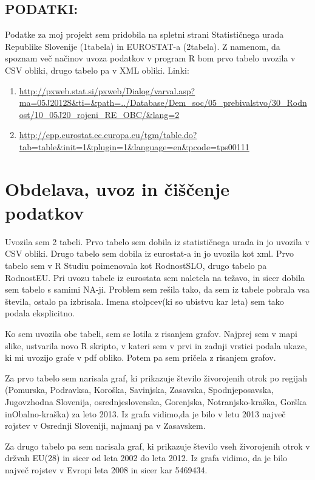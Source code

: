 \documentclass[11pt,a4paper]{article}
\begin{document}
 

\subsection{PODATKI:}
Podatke za moj projekt sem pridobila na spletni strani Statističnega urada Republike Slovenije (1tabela) in EUROSTAT-a (2tabela). Z namenom, da spoznam več načinov uvoza podatkov v program R bom prvo tabelo uvozila v CSV obliki, drugo tabelo pa v XML obliki.
Linki:
\begin{enumerate}
\item{\url{http://pxweb.stat.si/pxweb/Dialog/varval.asp?ma=05J2012S&ti=&path=../Database/Dem_soc/05_prebivalstvo/30_Rodnost/10_05J20_rojeni_RE_OBC/&lang=2}}
\item{\url{http://epp.eurostat.ec.europa.eu/tgm/table.do?tab=table&init=1&plugin=1&language=en&pcode=tps00111}}
\end{enumerate}


 
\newpage
\section{Obdelava, uvoz in čiščenje podatkov}

Uvozila sem 2 tabeli. Prvo tabelo sem dobila iz statističnega urada in jo uvozila v CSV obliki. Drugo tabelo sem dobila iz eurostat-a in jo uvozila kot xml. Prvo tabelo sem v R Studiu poimenovala kot RodnostSLO, drugo tabelo pa RodnostEU.
Pri uvozu tabele iz eurostata sem naletela na težavo, in sicer dobila sem tabelo s samimi NA-ji. Problem sem rešila tako, da sem iz tabele pobrala vsa števila, ostalo pa izbrisala. Imena stolpcev(ki so ubistvu kar leta) sem tako podala eksplicitno.

Ko sem uvozila obe tabeli, sem se lotila z risanjem grafov. Najprej sem v mapi slike, ustvarila novo R skripto, v kateri sem v prvi in zadnji vrstici podala ukaze, ki mi uvozijo grafe v pdf obliko. Potem pa sem pričela z risanjem grafov.

Za prvo tabelo sem narisala graf, ki prikazuje število živorojenih otrok po regijah (Pomurska, Podravksa, Koroška, Savinjska, Zasavska, Spodnjeposavska, Jugovzhodna Slovenija, osrednjeslovenska, Gorenjska, Notranjsko-kraška, Gorška inObalno-kraška) za leto 2013. 
Iz grafa vidimo,da je bilo v letu 2013 največ rojstev v Osrednji Sloveniji, najmanj pa v Zasavskem.

Za drugo tabelo pa sem narisala graf, ki prikazuje število vseh živorojenih otrok v držvah EU(28) in sicer od leta 2002 do leta 2012. Iz grafa vidimo, da je bilo največ rojstev v Evropi leta 2008 in sicer kar 5469434.
\end{document}
